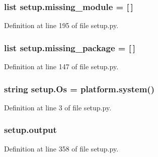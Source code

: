 \subsubsection[{\texorpdfstring{missing\+\_\+module}{missing_module}}]{\setlength{\rightskip}{0pt plus 5cm}list setup.\+missing\+\_\+module = \mbox{[}$\,$\mbox{]}}\hypertarget{namespacesetup_a9c08eb458bd1b35c49b4aeddb58b03af}{}\label{namespacesetup_a9c08eb458bd1b35c49b4aeddb58b03af}


Definition at line 195 of file setup.\+py.

\subsubsection[{\texorpdfstring{missing\+\_\+package}{missing_package}}]{\setlength{\rightskip}{0pt plus 5cm}list setup.\+missing\+\_\+package = \mbox{[}$\,$\mbox{]}}\hypertarget{namespacesetup_a82d52368b879302df365513569195970}{}\label{namespacesetup_a82d52368b879302df365513569195970}


Definition at line 147 of file setup.\+py.

\subsubsection[{\texorpdfstring{Os}{Os}}]{\setlength{\rightskip}{0pt plus 5cm}string setup.\+Os = platform.\+system()}\hypertarget{namespacesetup_ad8426f1e8d88dc4a6601f003805f9224}{}\label{namespacesetup_ad8426f1e8d88dc4a6601f003805f9224}


Definition at line 3 of file setup.\+py.

\subsubsection[{\texorpdfstring{output}{output}}]{\setlength{\rightskip}{0pt plus 5cm}setup.\+output}\hypertarget{namespacesetup_a9a9fe68847ae604c87e0c586206415d9}{}\label{namespacesetup_a9a9fe68847ae604c87e0c586206415d9}


Definition at line 358 of file setup.\+py.

